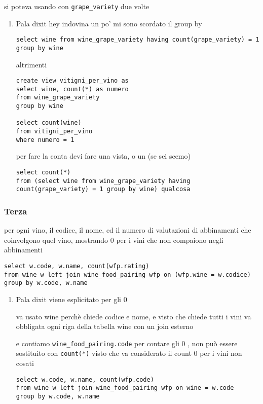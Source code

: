 \documentclass[11pt]{article}
\begin{document}
si poteva usando con \texttt{grape\_variety} due volte
\begin{enumerate}
\item Pala dixit
\label{sec:org22b7e09}
hey indovina un po' mi sono scordato il group by

\begin{verbatim}
select wine from wine_grape_variety having count(grape_variety) = 1 group by wine
\end{verbatim}

altrimenti

\begin{verbatim}
create view vitigni_per_vino as 
select wine, count(*) as numero
from wine_grape_variety
group by wine

select count(wine)
from vitigni_per_vino
where numero = 1
\end{verbatim}

per fare la conta devi fare una vista, o un (se sei scemo)
\begin{verbatim}
select count(*)
from (select wine from wine_grape_variety having count(grape_variety) = 1 group by wine) qualcosa
\end{verbatim}
\end{enumerate}

\subsubsection{Terza}
\label{sec:orgd7f0c7e}
per ogni vino, il codice, il nome, ed il numero di valutazioni di abbinamenti che
coinvolgono quel vino, mostrando 0 per i vini che non compaiono negli abbinamenti

\begin{verbatim}
select w.code, w.name, count(wfp.rating)
from wine w left join wine_food_pairing wfp on (wfp.wine = w.codice)
group by w.code, w.name
\end{verbatim}

\begin{enumerate}
\item Pala dixit
\label{sec:org07b3461}
viene esplicitato per gli 0

va usato wine perchè chiede codice e nome, e visto che chiede tutti i vini va obbligata
ogni riga della tabella wine con un join esterno

e contiamo \texttt{wine\_food\_pairing.code} per contare gli 0 , non può essere sostituito con
\texttt{count(*)} visto che va considerato il count 0 per i vini non cosati

\begin{verbatim}
select w.code, w.name, count(wfp.code)
from wine w left join wine_food_pairing wfp on wine = w.code
group by w.code, w.name
\end{verbatim}
\end{enumerate}
\end{document}
